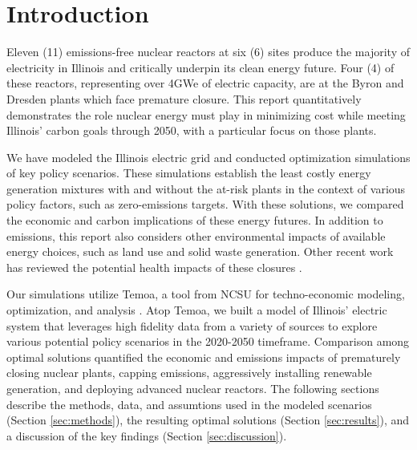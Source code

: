 \section{Introduction}\label{sec:intro}
Eleven (11) emissions-free nuclear reactors at six (6) sites produce the majority of
electricity in Illinois and critically underpin its clean energy future. Four 
(4) of these reactors, representing over 4GWe of electric capacity, are at the Byron 
and Dresden plants which face premature closure. This
report quantitatively demonstrates the role nuclear energy must play in
minimizing cost while meeting Illinois’ carbon goals through 2050, with a 
particular focus on those plants. 

We have 
modeled the Illinois electric grid and conducted optimization simulations of 
key policy scenarios. These simulations establish the least costly energy 
generation mixtures with and without the at-risk plants in the context of 
various policy factors, such as zero-emissions targets. 
With these solutions, we compared the economic and carbon implications of these energy futures. 
In addition to emissions, this report also considers
other environmental impacts of available energy choices, such as land use and
solid waste generation. Other recent work has reviewed the potential health 
impacts of these closures \cite{catf_potential_2021}.

Our simulations utilize Temoa, a tool from \gls{NCSU} for techno-economic 
modeling, optimization, and analysis 
\cite{decarolis_temoa_2010,decarolis_modelling_2016,decarolis_formalizing_2017}.  
Atop Temoa, we built a model of Illinois' electric system that leverages high 
fidelity data from a variety of sources to explore various potential policy 
scenarios in the 2020-2050 timeframe.  Comparison among optimal solutions 
quantified the economic and emissions impacts of prematurely closing nuclear 
plants, capping emissions, aggressively installing renewable generation, and 
deploying advanced nuclear reactors.  The following sections describe the 
methods, data, and assumtions used in the modeled scenarios (Section 
\ref{sec:methods}), the resulting optimal solutions (Section 
\ref{sec:results}), and a discussion of the key findings (Section 
\ref{sec:discussion}).  
